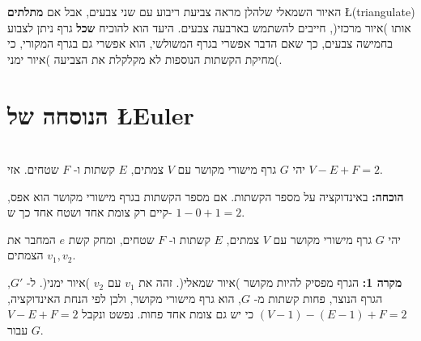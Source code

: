 האיור השמאלי שלהלן מראה צביעת ריבוע עם שני צבעים, אבל אם 
\textbf{מתלתים}
\L{(triangulate)} 
אותו )איור מרכזי(, חייבים להשתמש בארבעה צבעים. היעד הוא להוכיח 
\textbf{שכל}
גרף ניתן לצבוע בחמישה צבעים, כך שאם הדבר אפשרי בגרף המשולשי, הוא אפשרי גם בגרף המקורי, כי מחיקת הקשתות הנוספות לא מקלקלת את הצביעה )איור ימני(.
\begin{figure}
\begin{center}
\caption{}\label{}
\end{center}
\end{figure}

\section{הנוסחה של
\L{Euler}}

\begin{theorem}[\L{Euler}]\label{thm.euler}\mbox{}\\
יהי
$G$
גרף מישורי מקושר עם
$V$
צמתים,
$E$
קשתות ו-%
$F$
שטחים. אזי
$V-E+F=2$.
\end{theorem}

\textbf{הוכחה:}
באינדוקציה על מספר הקשתות. אם מספר הקשתות בגרף מישורי מקושר הוא אפס, קיים רק צומת אחד ושטח אחד כך ש-%
$1-0+1=2$.

יהי 
$G$
גרף מישורי מקושר עם 
$V$
צמתים, 
$E$
קשתות ו-%
$F$
שטחים, ומחק קשת 
$e$
המחבר את הצמתים
$v_1,v_2$.


\textbf{מקרה 1:}
הגרף מפסיק להיות מקושר )איור שמאלי(. זהה את
$v_1$
עם
$v_2$
)איור ימני(.
ל-%
$G'$,
הגרף הנוצר, פחות קשתות מ-%
$G$,
הוא גרף מישורי מקושר,
ולכן לפי הנחת האינדוקציה,
$(V-1)-(E-1)+F=2$
כי יש גם צומת אחד פחות. נפשט ונקבל
$V-E+F=2$
עבור
$G$.

